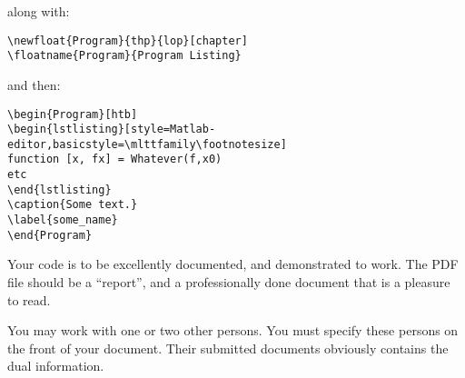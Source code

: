 \documentclass[12pt]{article}
\begin{document}
along with:

\begin{verbatim}
\newfloat{Program}{thp}{lop}[chapter]
\floatname{Program}{Program Listing}
\end{verbatim}

and then:

\begin{verbatim}
\begin{Program}[htb]
\begin{lstlisting}[style=Matlab-editor,basicstyle=\mlttfamily\footnotesize]
function [x, fx] = Whatever(f,x0)
etc
\end{lstlisting}
\caption{Some text.}
\label{some_name}
\end{Program}
\end{verbatim}

Your code is to be excellently documented, and demonstrated to work. The PDF file should be a “report”, and a professionally done document that is a pleasure to read.

\medskip

You may work with one or two other persons. You must specify these persons on the front of your document. Their submitted documents obviously contains the dual information.
\end{document}
